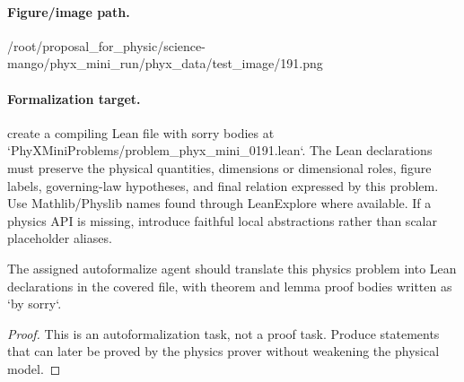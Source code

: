 \paragraph{Figure/image path.}
/root/proposal\_for\_physic/science-mango/phyx\_mini\_run/phyx\_data/test\_image/191.png

\paragraph{Formalization target.}
create a compiling Lean file with sorry bodies at `PhyXMiniProblems/problem\_phyx\_mini\_0191.lean`. The Lean declarations must preserve the physical quantities, dimensions or dimensional roles, figure labels, governing-law hypotheses, and final relation expressed by this problem.
Use Mathlib/Physlib names found through LeanExplore where available. If a physics API is missing, introduce faithful local abstractions rather than scalar placeholder aliases.

\begin{theorem}
\label{thm:physics:phyx_mini_0191:target}
The assigned autoformalize agent should translate this physics problem into Lean declarations in the covered file, with theorem and lemma proof bodies written as `by sorry`.
\end{theorem}
\begin{proof}
This is an autoformalization task, not a proof task. Produce statements that can later be proved by the physics prover without weakening the physical model.
\end{proof}

